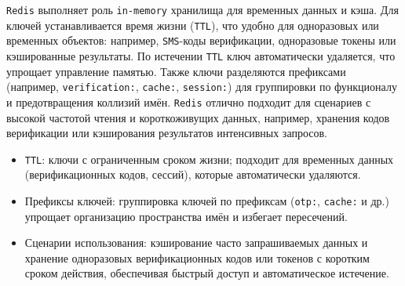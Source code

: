 \texttt{Redis} выполняет роль \texttt{in-memory} хранилища для временных данных и кэша. Для ключей устанавливается время жизни (\texttt{TTL}), что удобно для одноразовых или временных объектов: например, \texttt{SMS}-коды верификации, одноразовые токены или кэшированные результаты. По истечении \texttt{TTL} ключ автоматически удаляется, что упрощает управление памятью. Также ключи разделяются префиксами (например, \texttt{verification:}, \texttt{cache:}, \texttt{session:}) для группировки по функционалу и предотвращения коллизий имён. \texttt{Redis} отлично подходит для сценариев с высокой частотой чтения и короткоживущих данных, например, хранения кодов верификации или кэширования результатов интенсивных запросов.
\begin{itemize}
    \item \texttt{TTL}: ключи с ограниченным сроком жизни; подходит для временных данных (верификационных кодов, сессий), которые автоматически удаляются.
    \item Префиксы ключей: группировка ключей по префиксам (\texttt{otp:}, \texttt{cache:} и др.) упрощает организацию пространства имён и избегает пересечений.
    \item Сценарии использования: кэширование часто запрашиваемых данных и хранение одноразовых верификационных кодов или токенов с коротким сроком действия, обеспечивая быстрый доступ и автоматическое истечение.
\end{itemize}

